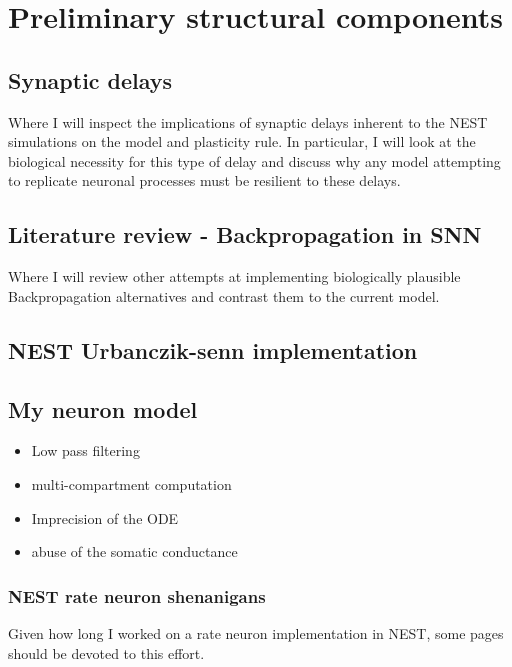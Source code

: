 \documentclass[12pt,a4paper,titlepage]{report}
\begin{document}
\newpage

\chapter{Preliminary structural components}

\section{Synaptic delays}

Where I will inspect the implications of synaptic delays inherent to the NEST simulations on
the model and plasticity rule. In particular, I will look at the biological necessity for this
type of delay and discuss why any model attempting to replicate neuronal processes must be resilient
to these delays.


\section{Literature review - Backpropagation in SNN}

Where I will review other attempts at implementing biologically plausible Backpropagation
alternatives and contrast them to the current model.

\section{NEST Urbanczik-senn implementation}


\section{My neuron model}

\begin{itemize}
  \item Low pass filtering
  \item multi-compartment computation
  \item Imprecision of the ODE
  \item abuse of the somatic conductance
\end{itemize}

\subsection{NEST rate neuron shenanigans}

Given how long I worked on a rate neuron implementation in NEST, some pages should be devoted
to this effort.
\end{document}
